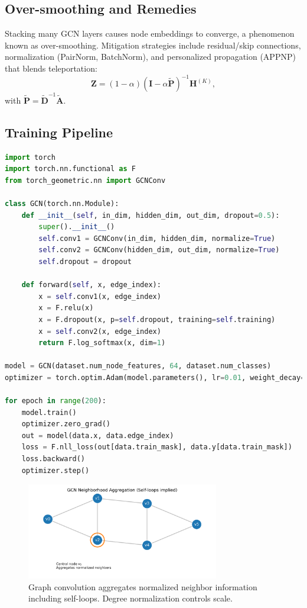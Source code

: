\documentclass{article}
\begin{document}
\subsection{Over-smoothing and Remedies}
Stacking many GCN layers causes node embeddings to converge, a phenomenon known as over-smoothing. Mitigation strategies include residual/skip connections, normalization (PairNorm, BatchNorm), and personalized propagation (APPNP) that blends teleportation:
\begin{equation}
  \mathbf{Z} = (1-\alpha) \left(\mathbf{I} - \alpha \tilde{\mathbf{P}}\right)^{-1} \mathbf{H}^{(K)},
\end{equation}
with $\tilde{\mathbf{P}} = \tilde{\mathbf{D}}^{-1} \tilde{\mathbf{A}}$.

\subsection{Training Pipeline}
\begin{lstlisting}[language=Python, caption={Two-layer GCN for semi-supervised node classification (PyTorch Geometric).}]
import torch
import torch.nn.functional as F
from torch_geometric.nn import GCNConv

class GCN(torch.nn.Module):
    def __init__(self, in_dim, hidden_dim, out_dim, dropout=0.5):
        super().__init__()
        self.conv1 = GCNConv(in_dim, hidden_dim, normalize=True)
        self.conv2 = GCNConv(hidden_dim, out_dim, normalize=True)
        self.dropout = dropout

    def forward(self, x, edge_index):
        x = self.conv1(x, edge_index)
        x = F.relu(x)
        x = F.dropout(x, p=self.dropout, training=self.training)
        x = self.conv2(x, edge_index)
        return F.log_softmax(x, dim=1)

model = GCN(dataset.num_node_features, 64, dataset.num_classes)
optimizer = torch.optim.Adam(model.parameters(), lr=0.01, weight_decay=5e-4)

for epoch in range(200):
    model.train()
    optimizer.zero_grad()
    out = model(data.x, data.edge_index)
    loss = F.nll_loss(out[data.train_mask], data.y[data.train_mask])
    loss.backward()
    optimizer.step()
\end{lstlisting}

\begin{figure}[H]
  \centering
  \includegraphics[width=0.75\textwidth]{gcn_graph_structure.png}
  \caption{Graph convolution aggregates normalized neighbor information including self-loops. Degree normalization controls scale.}
  \label{fig:gcn_graph_structure}
\end{figure}
\end{document}
